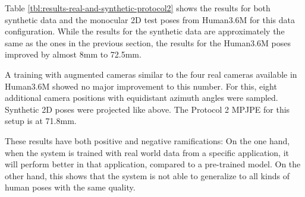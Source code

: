 

Table \ref{tbl:results-real-and-synthetic-protocol2} shows the results for both synthetic data and the monocular 2D test poses from Human3.6M for this data configuration.
While the results for the synthetic data are approximately the same as the ones in the previous section, the results for the Human3.6M poses improved by almost 8mm to 72.5mm.

A training with augmented cameras similar to the four real cameras available in Human3.6M showed no major improvement to this number.
For this, eight additional camera positions with equidistant azimuth angles were sampled.
Synthetic 2D poses were projected like above.
The Protocol 2 MPJPE for this setup is at 71.8mm.

These results have both positive and negative ramifications:
On the one hand, when the system is trained with real world data from a specific application, it will perform better in that application, compared to a pre-trained model.
On the other hand, this shows that the system is not able to generalize to all kinds of human poses with the same quality. 

